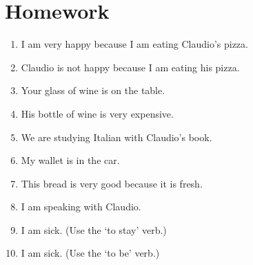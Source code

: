 \section{Homework}
\begin{enumerate}
    \item I am very happy because I am eating Claudio's pizza. \\
    
    \item Claudio is not happy because I am eating his pizza. \\
     
    \item Your glass of wine is on the table. \\
    
    \item His bottle of wine is very expensive. \\
    
    \item We are studying Italian with Claudio's book. \\
    
    \item My wallet is in the car. \\
    
    \item This bread is very good because it is fresh. \\
    
    \item I am speaking with Claudio. \\
    
    \item I am sick. (Use the `to stay' verb.) \\
    
    \item I am sick. (Use the `to be' verb.) \\
\end{enumerate}

